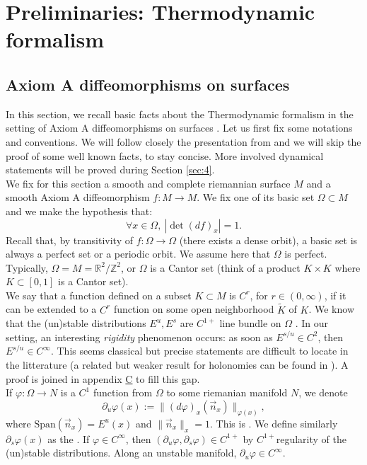 \documentclass[a4paper]{article}
\theoremstyle{definition}
\begin{document}
\section{Preliminaries: Thermodynamic formalism}\label{sec:preli}

\subsection{Axiom A diffeomorphisms on surfaces}

In this section, we recall basic facts about the Thermodynamic formalism in the setting of Axiom A diffeomorphisms on surfaces 
\cite{Bo75,KH95,BS02}. Let us first fix some notations and conventions. We will follow closely the presentation from \cite{Le24,Le23b} and we will skip the proof of some well known facts, to stay concise. More involved dynamical statements will be proved during Section \ref{sec:4}. \\

We fix for this section a smooth and complete riemannian surface $M$ and a smooth Axiom A diffeomorphism $f:M \rightarrow M$. We fix one of its basic set $\Omega \subset M$ and we make the hypothesis that:
$$ \forall x \in \Omega, \ |\det (df)_x| = 1 .$$
Recall that, by transitivity of $f:\Omega \rightarrow \Omega$ (there exists a dense orbit), a basic set is always a perfect set or a periodic orbit. We assume here that $\Omega$ is perfect. Typically, $\Omega=M=\mathbb{R}^2/\mathbb{Z}^2$, or $\Omega$ is a Cantor set (think of a product $K \times K$ where $K \subset [0,1]$ is a Cantor set). \\

We say that a function defined on a subset $K \subset M$ is $C^{r}$, for $r \in (0,\infty)$, if it can be extended to a $C^r$ function on some open neighborhood $\tilde{K}$ of $K$.
We know that the (un)stable distributions $E^u,E^s$ are $C^{1+}$ line bundle on $\Omega$ \cite{PR02}. In our setting, an interesting \emph{rigidity} phenomenon occurs: as soon as $E^{s/u} \in C^2$, then $E^{s/u} \in C^\infty$. This seems classical but precise statements are difficult to locate in the litterature (a related but weaker result for holonomies can be found in \cite{PR05}). A proof is joined in appendix \hyperref[ap:C]{C} to fill this gap.  \\

If $\varphi:\Omega \rightarrow N$ is a $C^{1}$ function from $\Omega$ to some riemanian manifold $N$, we denote $$\partial_u \varphi(x) := \| {(d\varphi)_x}(\vec{n}_x) \|_{\varphi(x)},$$ where $\text{Span}(\vec{n}_x) = E^u(x)$ and $\|\vec{n}_x\|_x=1$. This is .
We define similarly $\partial_s \varphi(x)$ as the . If $\varphi \in C^{\infty}$, then $(\partial_u \varphi, \partial_s \varphi) \in C^{1+}$ by $C^{1+}$regularity of the (un)stable distributions. Along an unstable manifold, $\partial_u \varphi \in C^\infty$. \\
\end{document}
